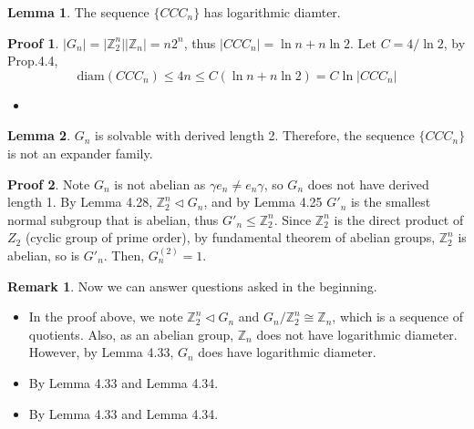 \documentclass{book}
\newcommand{\Z}{\mathbb{Z}}
\newcommand{\diam}[1]{\textrm{diam}( #1 )}
\newcommand{\abs}[1]{\lvert #1 \rvert }
\theoremstyle{definition}
\newtheorem{lemma}{Lemma}[chapter]
\theoremstyle{remarkstyle}
\newtheorem*{remark}{Remark}%
\newtheorem*{myproof}{Proof}%
\begin{document}
\begin{lemma}
    The sequence $\{CCC_{n}\} $ has logarithmic diamter. 
\end{lemma}
\begin{myproof}
    $\abs{G_{n}}=\abs{\Z^{n}_{2}}\abs{\Z_{n}}=n2^{n} $, thus $\abs{CCC_{n}}=\ln n+n\ln 2$. Let $C=4/\ln 2$, by Prop.4.4, $$
    \diam{CCC_{n}} \le 4n \le C(\ln n+n\ln 2) = C\ln\abs{CCC_{n}} 
    $$ 
    \begin{itemize}
        \item[] 
    \end{itemize}
\end{myproof}


\begin{lemma}
    $G_{n} $ is solvable with derived length 2. Therefore, the sequence $\{CCC_{n} \} $ is not an expander family. 
\end{lemma}
\begin{myproof}
    Note $G_{n} $ is not abelian as $\gamma e_{n} \ne e_{n}\gamma $, so $G_{n} $ does not have derived length 1. By Lemma 4.28, $\Z^{n}_{2} \triangleleft G_{n} $, and by Lemma 4.25 $G'_{n} $ is the smallest normal subgroup that is abelian, thus $G'_{n} \le \Z^{n}_{2} $. Since $\Z^{n}_{2} $ is the direct product of $Z_{2} $ (cyclic group of prime order), by fundamental theorem of abelian groups, $\Z^{n}_{2} $ is abelian, so is $G'_{n} $. Then, $G^{(2)}_{n} = 1 $.
\end{myproof}
\begin{remark}
    Now we can answer questions asked in the beginning. 
    \begin{itemize}
        \item[1] In the proof above, we note $\Z^{n}_{2} \triangleleft G_{n}  $ and $G_{n}/\Z^{n}_{2} \cong \Z_{n} $, which is a sequence of quotients. Also, as an abelian group, $\Z_{n} $ does not have logarithmic diameter. However, by Lemma 4.33, $G_{n} $ does have logarithmic diameter. 
        \item[2] By Lemma 4.33 and Lemma 4.34.
        \item[3] By Lemma 4.33 and Lemma 4.34.
    \end{itemize}
\end{remark}
\end{document}
